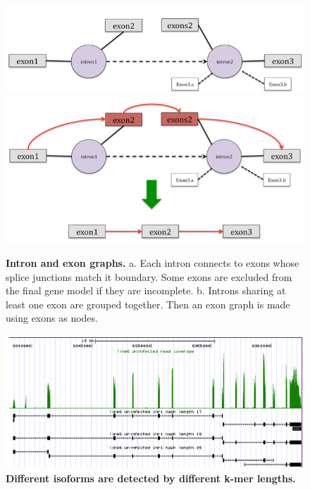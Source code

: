 \documentclass[10pt]{article}
\begin{document}
\begin{figure}[!ht]
\begin{center}
\includegraphics[width=5in]{figure3a.png}
\includegraphics[width=5in]{figure3b.png}
\end{center}
\caption{
{\bf Intron and exon graphs.}
a. Each intron connects to exons whose splice junctions match it boundary.
Some exons are excluded from the final gene model if they are incomplete.
b. Introns sharing at least one exon are grouped together.
Then an exon graph is made using exons as nodes.
}
\label{figure3}
\end{figure}

\begin{figure}[!ht]
\begin{center}
\includegraphics[width=5in]{figure4.png}
\end{center}
\caption{
{\bf Different isoforms are detected by different k-mer lengths.}
}
\label{figure4}
\end{figure}
\end{document}
